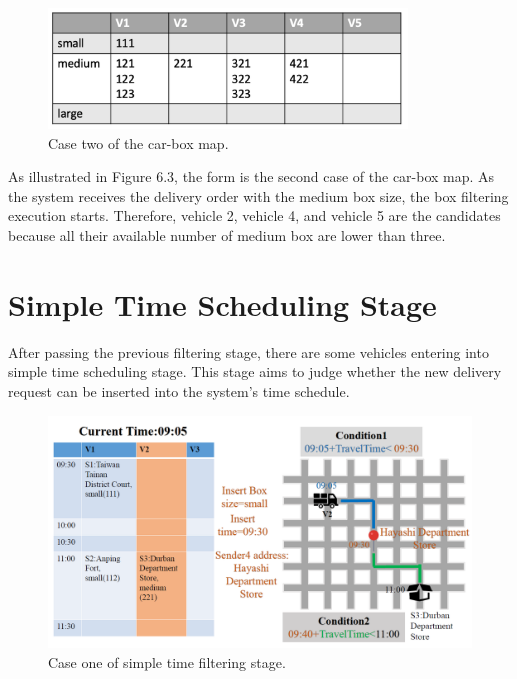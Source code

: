 \documentclass[12pt]{ksthesis}
\begin{document}
\begin{thesis}
{\begin{figure}[t]
\centering
\includegraphics[width=0.85\textwidth]{./Thesis_figures/F6-3_caseTwo_boxFiltering.PNG}
\caption{\large Case two of the car-box map.}
\vspace{0.5cm}
\label{Fig:CaseTwo_carBox_Map}
\end{figure}

As illustrated in Figure 6.3, the form is the second case of the car-box map. As the system receives the delivery order with the medium box size, the box filtering execution starts. Therefore, vehicle 2, vehicle 4, and vehicle 5 are the candidates because all their available number of medium box are lower than three.

\section{ Simple Time Scheduling Stage}

After passing the previous filtering stage, there are some vehicles entering into simple time scheduling stage. This stage aims to judge whether the new delivery request can be inserted into the system’s time schedule.

\begin{figure}[H]
\centering
\includegraphics[width=1.14\textwidth]{./Thesis_figures/F6-4_caseOne_SchedulingStage.PNG}
\caption{\large Case one of simple time filtering stage.}
\vspace{0.5cm}
\label{Fig:CaseOne_TimeFiltering}
\end{figure}

}
\end{thesis}
\end{document}
